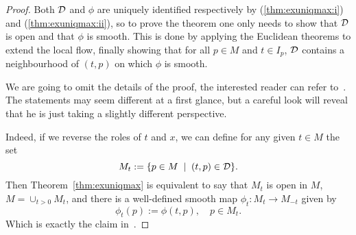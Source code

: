 \begin{proof}
	Both $\mathcal{D}$ and $\phi$ are uniquely identified respectively by (\ref{thm:exuniqmax:i}) and (\ref{thm:exuniqmax:ii}), so to prove the theorem one only needs to show that $\mathcal{D}$ is open and that $\phi$ is smooth.
	This is done by applying the Euclidean theorems to extend the local flow, finally showing that for all $p\in M$ and $t\in I_p$, $\mathcal{D}$ contains a neighbourhood of $(t,p)$ on which $\phi$ is smooth.

	We are going to omit the details of the proof, the interested reader can refer to~\cite[Proposition 9.12]{book:lee}.
	The statements may seem different at a first glance, but a careful look will reveal that he is just taking a slightly different perspective.

	Indeed, if we reverse the roles of $t$ and $x$, we can define for any given $t\in M$ the set
	\begin{equation}
		M_t := \{p\in M \;\mid\; (t,p)\in\mathcal{D}\}.
	\end{equation}
	Then Theorem~\ref{thm:exuniqmax} is equivalent to say that $M_t$ is open in $M$, $M = \cup_{t>0} M_t$, and there is a well-defined smooth map $\phi_t : M_t \to M_{-t}$ given by
	\begin{equation}\label{eq:flowdiffeo}
		\phi_t(p) := \phi(t,p), \quad p\in M_t.
	\end{equation}
	Which is exactly the claim in~\cite[Proposition 9.12]{book:lee}.





\end{proof}
